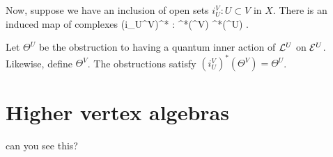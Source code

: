 \documentclass[10pt]{amsart}
\begin{document}
Now, suppose we have an inclusion of open sets $i_U^V : U \subset V$ in $X$. There is an induced map of complexes
\ben
(i_U^V)^* : \cloc^*(\cL^V) \to \cloc^*(\cL^U) .
\een

\begin{lem} Let $\Theta^U$ be the obstruction to having a quantum inner action of $\mathcal L^U$ on $\mathcal E^U$. Likewise, define $\Theta^V$. The obstructions satisfy $(i_U^V)^*(\Theta^V) = \Theta^U$. 
\end{lem}

\section{Higher vertex algebras}

can you see this?
\end{document}
